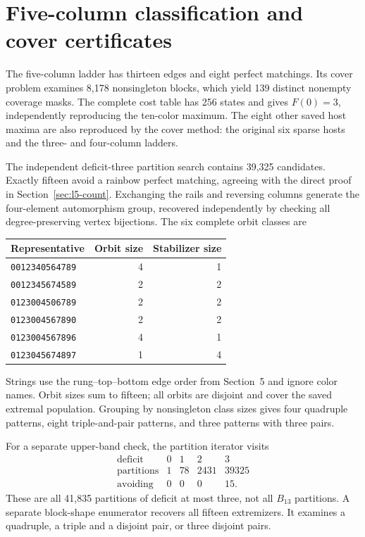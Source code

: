 \documentclass[11pt,letterpaper]{article}
\begin{document}
\newpage
\section{Five-column classification and cover certificates}
The five-column ladder has thirteen edges and eight perfect matchings.
Its cover problem examines 8,178 nonsingleton blocks, which yield 139
distinct nonempty coverage masks. The complete cost table has 256 states
and gives $F(0)=3$, independently reproducing the ten-color maximum.
The eight other saved host maxima are also reproduced by the cover method:
the original six sparse hosts and the three- and four-column ladders.

The independent deficit-three partition search contains 39,325 candidates.
Exactly fifteen avoid a rainbow perfect matching, agreeing with the direct
proof in Section~\ref{sec:l5-count}. Exchanging the rails and reversing columns generate
the four-element automorphism group, recovered independently by checking
all degree-preserving vertex bijections. The six complete orbit classes are
\begin{center}\small
\begin{tabular}{lrr}
\toprule
Representative & Orbit size & Stabilizer size\\
\midrule
\texttt{0012340564789} & 4 & 1\\
\texttt{0012345674589} & 2 & 2\\
\texttt{0123004506789} & 2 & 2\\
\texttt{0123004567890} & 2 & 2\\
\texttt{0123004567896} & 4 & 1\\
\texttt{0123045674897} & 1 & 4\\
\bottomrule
\end{tabular}
\end{center}
Strings use the rung--top--bottom edge order from Section~5 and ignore
color names. Orbit sizes sum to fifteen; all orbits are disjoint and cover
the saved extremal population. Grouping by nonsingleton class sizes gives
four quadruple patterns, eight triple-and-pair patterns, and three patterns
with three pairs.

For a separate upper-band check, the partition iterator visits
\[
\begin{array}{c|rrrr}
\text{deficit}&0&1&2&3\\ \hline
\text{partitions}&1&78&2431&39325\\
\text{avoiding}&0&0&0&15 .
\end{array}
\]
These are all 41,835 partitions of deficit at most three, not all $B_{13}$
partitions. A separate block-shape enumerator recovers all fifteen extremizers.
It examines a quadruple, a triple and a disjoint pair, or three disjoint pairs.
\end{document}
